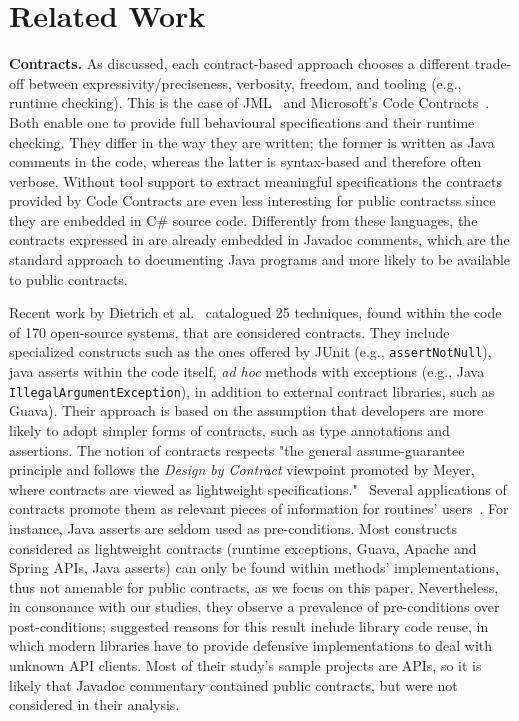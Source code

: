 \section{Related Work}
\label{sec:relatedWork}

\textbf{Contracts.} 
As discussed, each contract-based approach choo\-ses a different trade-off between expressivity/preciseness, verbosity, freedom, and tooling (e.g., runtime checking).
This is the case of JML~\cite{jml} and Microsoft's Code Contracts~\cite{codeContractsPaper}.
Both enable one to provide full behavioural specifications and their runtime checking. 
They differ in the way they are written; the former is written as Java comments in the code, whereas the latter is syntax-based and therefore often verbose. 
Without tool support to extract meaningful specifications the contracts provided by Code Contracts are even less interesting for public contractss since they are embedded in C\# source code. Differently from these languages, the contracts expressed in \contractjdoc{} are already embedded in Javadoc comments, which are the standard approach to documenting Java programs and more likely to be available to public contracts.

Recent work by Dietrich et al.~\cite{Dietrich2017} catalogued 25 techniques, found within the code of 170 open-source systems, that are considered contracts. They include specialized constructs such as the ones offered by JUnit (e.g., \texttt{assertNotNull}), java asserts within the code itself, \emph{ad hoc} methods with exceptions (e.g., Java \texttt{IllegalArgumentException}), in addition to external contract libraries, such as Guava). 
Their approach is based on the assumption that developers are more likely to adopt simpler forms of contracts, such as type annotations and assertions. The notion of contracts respects "the general assume-guarantee principle and follows the \emph{Design by Contract} viewpoint promoted by Meyer, where contracts are viewed as lightweight specifications."~\cite{dbc} 
Several applications of contracts promote them as relevant pieces of information for routines' users~\cite{docAnalysis}. For instance, Java asserts are seldom used as pre-conditions. Most constructs considered as lightweight contracts (runtime exceptions, Guava, Apache and Spring APIs, Java asserts) can only be found within methods' implementations, thus not amenable for public contracts, as we focus on this paper.
Nevertheless, in consonance with our studies, they observe a prevalence of pre-conditions over post-conditions; suggested reasons for this result include library code reuse, in which modern libraries have to provide defensive implementations to deal with unknown API clients. Most of their study's sample projects are APIs, so it is likely that Javadoc commentary contained public contracts, but were not considered in their analysis.

